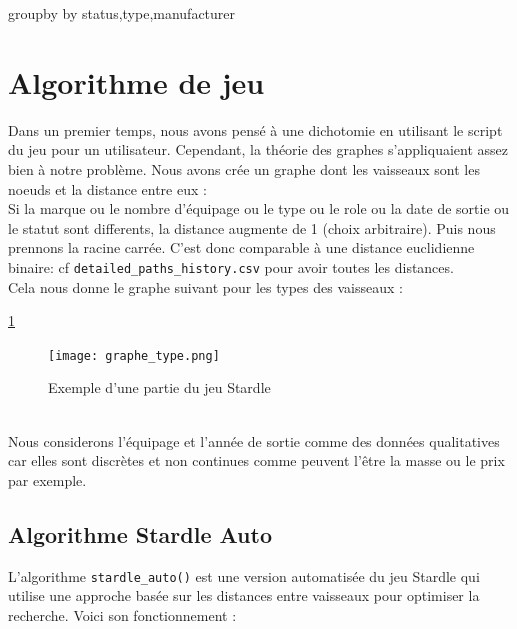 \documentclass{article}
\begin{document}
\begin{algorithm}[H]
    \SetAlgoLined
    groupby by status,type,manufacturer\;
\end{algorithm}
\newline
\section{Algorithme de jeu}

Dans un premier temps, nous avons pensé à une dichotomie en utilisant le script du jeu pour un utilisateur.
Cependant, la théorie des graphes s'appliquaient assez bien à notre problème.  
Nous avons crée un graphe dont les vaisseaux sont les noeuds et la distance entre eux : \\
Si la marque ou le nombre d'équipage ou le type ou le role ou la date de sortie ou le statut sont differents,
la distance augmente de 1 (choix arbitraire). Puis nous prennons la racine carrée. C'est donc comparable à une distance euclidienne binaire: cf \verb|detailed_paths_history.csv| pour avoir toutes les distances.\\
Cela nous donne le graphe suivant pour les types des vaisseaux :

\ref{fig:graph}
\begin{figure}[h]
    \centering
    \texttt{[image: graphe\_type.png]}
    \caption{Exemple d'une partie du jeu Stardle}
    \label{fig:graph}
\end{figure}
\\
Nous considerons l'équipage et l'année de sortie comme des données qualitatives car elles sont discrètes et non 
continues comme peuvent l'être la masse ou le prix par exemple. 

\subsection{Algorithme Stardle Auto}

L'algorithme \texttt{stardle\_auto()} est une version automatisée du jeu Stardle qui utilise une approche basée sur les distances entre vaisseaux pour optimiser la recherche. Voici son fonctionnement :
\end{document}
